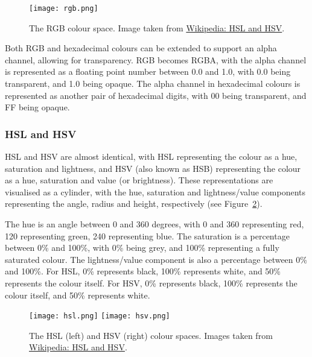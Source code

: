 \documentclass[../main.tex]{subfiles}
\begin{document}
                \begin{figure}[H]
                    \centering
                    \texttt{[image: rgb.png]}
                        \caption{The RGB colour space.
                            Image taken from \href{https://en.wikipedia.org/wiki/HSL_and_HSV}{Wikipedia:
                                    HSL and HSV}.
                        }
                        \label{fig:rgb}
                \end{figure}

                Both RGB and hexadecimal colours can be extended to support an alpha channel,
                    allowing for transparency.
                RGB becomes RGBA, with the alpha channel is represented as a floating point
                    number between 0.0 and 1.0, with 0.0 being transparent, and 1.0 being opaque.
                The alpha channel in hexadecimal colours is represented as another pair of
                    hexadecimal digits, with 00 being transparent, and FF being opaque.

            \subsubsection{HSL and HSV}
                HSL and HSV are almost identical, with HSL representing the colour as a hue,
                    saturation and lightness, and HSV (also known as HSB) representing the colour
                    as a hue, saturation and value (or brightness).
                These representations are visualised as a cylinder, with the hue, saturation
                    and lightness/value components representing the angle, radius and height,
                    respectively (see Figure~\ref{fig:hsl}).

                The hue is an angle between 0 and 360 degrees, with 0 and 360 representing red,
                    120 representing green, 240 representing blue.
                The saturation is a percentage between 0\% and 100\%, with 0\% being grey, and
                    100\% representing a fully saturated colour.
                The lightness/value component is also a percentage between 0\% and 100\%.
                For HSL, 0\% represents black, 100\% represents white, and 50\% represents the
                    colour itself.
                For HSV, 0\% represents black, 100\% represents the colour itself, and 50\%
                    represents white.

                \begin{figure}[H]
                    \centering
                    \texttt{[image: hsl.png]}
                    \texttt{[image: hsv.png]}
                        \caption{The HSL (left) and HSV (right) colour spaces.
                            Images taken from \href{https://en.wikipedia.org/wiki/HSL_and_HSV}{Wikipedia:
                                    HSL and HSV}.
                        }
                        \label{fig:hsl}
                \end{figure}
\end{document}

